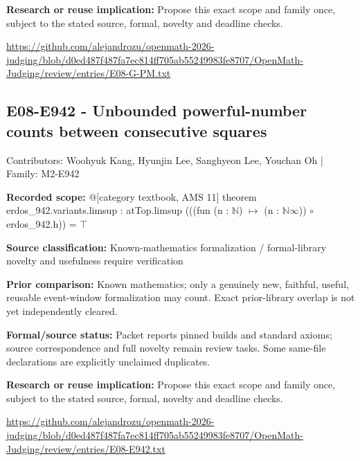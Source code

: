 \documentclass[11pt,a4paper]{article}
\begin{document}
\textbf{Research or reuse implication:} Propose this exact scope and family once, subject to the stated source, formal, novelty and deadline checks.

{\small \url{https://github.com/alejandrozu/openmath-2026-judging/blob/d0ed487f487fa7ec814ff705ab55249983fe8707/OpenMath-Judging/review/entries/E08-G-PM.txt}\par}

\begin{samepage}
\subsection{E08-E942  -  Unbounded powerful-number counts between consecutive squares}
{\small Contributors: Woohyuk Kang, Hyunjin Lee, Sanghyeon Lee, Youchan Oh | Family: M2-E942\par}

\textbf{Recorded scope:} @[category textbook, AMS 11] theorem erdos\_942.variants.limsup : atTop.limsup (((fun (n : \ensuremath{\mathbb{N}}) \ensuremath{\mapsto} (n : \ensuremath{\mathbb{N}}\ensuremath{\infty})) \ensuremath{\circ} erdos\_942.h)) = \ensuremath{\top}


\end{samepage}
\textbf{Source classification:} Known-mathematics formalization / formal-library novelty and usefulness require verification

\textbf{Prior comparison:} Known mathematics; only a genuinely new, faithful, useful, reusable event-window formalization may count. Exact prior-library overlap is not yet independently cleared.

\textbf{Formal/source status:} Packet reports pinned builds and standard axioms; source correspondence and full novelty remain review tasks. Some same-file declarations are explicitly unclaimed duplicates.

\textbf{Research or reuse implication:} Propose this exact scope and family once, subject to the stated source, formal, novelty and deadline checks.

{\small \url{https://github.com/alejandrozu/openmath-2026-judging/blob/d0ed487f487fa7ec814ff705ab55249983fe8707/OpenMath-Judging/review/entries/E08-E942.txt}\par}
\end{document}
